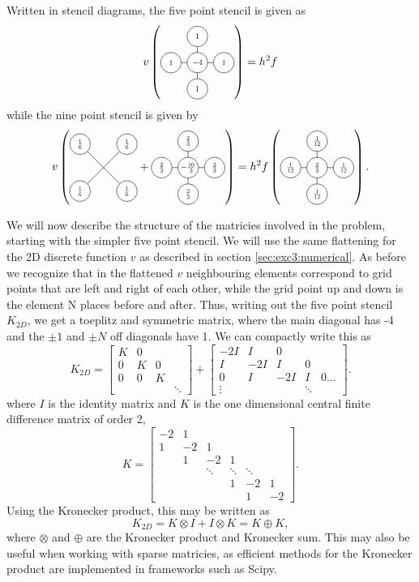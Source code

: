 Written in stencil diagrams, the five point stencil is given as \cite{part2}
$$
v \left(\crossStencil{1}{1}{1}{1}{-4}\right) = h^2 f
$$
while the nine point stencil is given by
$$
v
\left(
\xStencil{\frac16}{\frac16}{\frac16}{\frac16}
+
\crossStencil{\frac23}{\frac23}{\frac23}{\frac23}{-\frac{10}{3}}
\right)
=
h^2
f
\left(
\crossStencil{\frac1{12}}{\frac1{12}}{\frac1{12}}{\frac1{12}}{\frac23}
\right).
$$


We will now describe the structure of the matricies involved in the problem, starting with the simpler five point stencil.
We will use the same flattening for the 2D discrete function $v$ as described in section \ref{sec:exc3:numerical}.
As before we recognize that in the flattened $v$ neighbouring elements correspond to grid points that are left and right of each other, while the grid point up and down is the element N places before and after.
Thus, writing out the five point stencil $K_{2D}$, we get a toeplitz and symmetric matrix, where the main diagonal has -4 and the $\pm 1$ and $\pm N$ off diagonals have 1.
We can compactly write this as
$$
K_{2D} =
\begin{bmatrix}
  K & 0 \\
  0 & K & 0\\
  0 & 0 & K \\
  &&&\ddots
\end{bmatrix}
+
\begin{bmatrix}
  -2I & I & 0 &  \\
  I & -2I & I & 0 \\
  0 & I & -2I & I & 0 \dots\\
  \vdots&&&\ddots
\end{bmatrix}.
$$
where $I$ is the identity matrix and $K$ is the one dimensional central finite difference matrix of order 2,
$$
K =
\begin{bmatrix}
  -2 & 1 &   \\
  1 & -2 & 1 &  \\
  & 1 & -2 & 1 & \\
  &&\ddots&\ddots&\ddots\\
  &&& 1 & -2 & 1\\
  &&&& 1 & -2
\end{bmatrix}.
$$
Using the Kronecker product, this may be written as
$$
K_{2D} = K \otimes I + I \otimes K = K \oplus K,
$$
where $\otimes$ and $\oplus$ are the Kronecker product and Kronecker sum.
This may also be useful when working with sparse matricies, as efficient methods for the Kronecker product are implemented in frameworks such as Scipy\cite{scipy_kron}.

